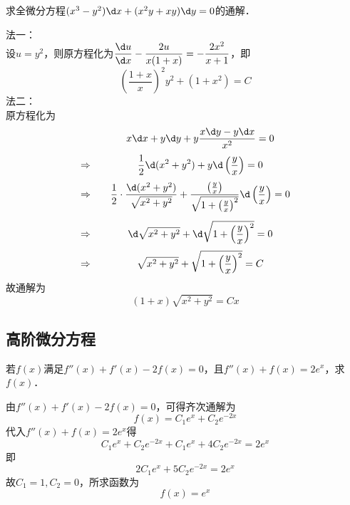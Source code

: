 \documentclass[12pt, a4paper, oneside, UTF8]{ctexbook}
\begin{document}
\begin{exercise}
    求全微分方程$(x^3-y^2)\d x +(x^2y+xy)\d y=0$的通解．
\end{exercise}
\begin{solution}
    法一：\\
    设$u=y^2$，则原方程化为$\displaystyle \frac{\d u}{\d x}-\frac{2u}{x(1+x)}=-\frac{2x^2}{x+1}$，即
    \[ \boxed{\left(\frac{1+x}{x}\right)^2y^2+(1+x^2)=C} \]
    法二：\\
    原方程化为
    \[
        \begin{array}{l@{\qquad}c}
            &\displaystyle x\d x+y \d y +y \frac{x\d y-y\d x}{x^2}=0\\[10pt]
            \Rightarrow & \displaystyle \dfrac{1}{2}\d(x^2+y^2)+y \d \left(\frac{y}{x}\right)=0\\[10pt]
            \Rightarrow & \displaystyle \dfrac{1}{2}\cdot \dfrac{\d(x^2+y^2)}{\sqrt{x^2+y^2}}+\dfrac{\left(\frac{y}{x}\right)}{\sqrt{1+\left(\frac{y}{x}\right)^2}}\d \left(\frac{y}{x}\right)=0\\[20pt]
            \Rightarrow & \displaystyle \d \sqrt{x^2+y^2}+\d \sqrt{1+\left(\frac{y}{x}\right)^2}=0\\[10pt]
            \Rightarrow & \displaystyle \sqrt{x^2+y^2}+\sqrt{1+\left(\frac{y}{x}\right)^2}=C\\
        \end{array}
    \]
    故通解为
    \[ \boxed{(1+x)\sqrt{x^2+y^2}=Cx} \]
\end{solution}
\subsection{高阶微分方程}
\begin{exercise}
    若$f(x)$满足$f''(x)+f'(x)-2f(x)=0$，且$f''(x)+f(x)=2e^{x}$，求$f(x)$．
\end{exercise}
\begin{solution}
    由$f''(x)+f'(x)-2f(x)=0$，可得齐次通解为
    \[f(x)=C_1 e^{x} + C_2 e^{-2x}\]
    代入$f''(x)+f(x)=2e^{x}$得
    \[C_1 e^{x} + C_2 e^{-2x} + C_1 e^{x} + 4 C_2 e^{-2x} = 2 e^{x}\]
    即
    \[2 C_1 e^{x} + 5 C_2 e^{-2x} = 2 e^{x}\]
    故$C_1=1,C_2=0$，所求函数为
    \[\boxed{f(x) = e^{x}}\]
\end{solution}
\end{document}
